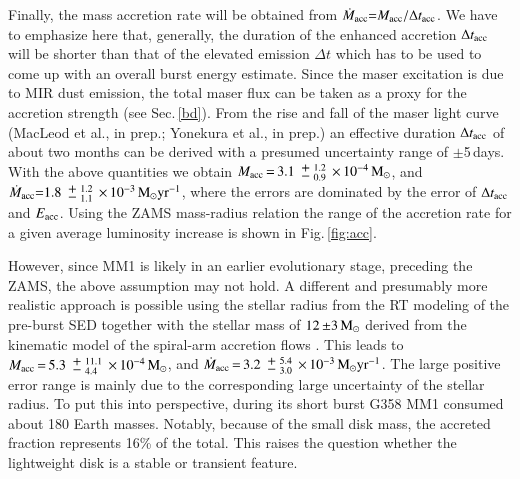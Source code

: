 Finally, the mass accretion rate will be obtained from $\dot{M}_{\rm acc}{=}M_{\rm acc}/\Delta t_{\rm acc}$. We have to emphasize here that, generally, the duration of the enhanced accretion $\Delta t_{\rm acc}$ will be shorter than that of the elevated emission $\Delta t$ which has to be used to come up with an overall burst energy estimate. Since the maser excitation is due to MIR dust emission, the total maser flux can be taken as a proxy for the accretion strength  (see Sec.\,\ref{bd}). From the rise and fall of the maser light curve (MacLeod et al., in prep.; Yonekura et al., in prep.) an effective duration $\Delta t_{\rm acc}$ of about two months can be derived with a presumed uncertainty range of ${\pm}$5\,days.
With the above quantities we obtain %
$M_{\rm acc}\,{=}\,3.1\mypm^{1.2}_{0.9}\,{\times}\,10^{-4}\,{\rm M}_{\odot}$, and $\dot{M}_{\rm acc}{=}1.8\mypm^{1.2}_{1.1}\,{\times}\,10^{-3}\,{\rm M}_{\odot}\rm yr^{-1}$,
where the errors are dominated by the error of 
$\Delta t_{\rm acc}$ and
$E_{\rm acc}$. 
Using the ZAMS mass-radius relation the range of the accretion rate for a given average luminosity increase is shown in Fig.\,\ref{fig:acc}.


However, since MM1 is likely in an earlier evolutionary stage, preceding the ZAMS, the above assumption may not hold. A different and presumably more realistic approach is possible using the
stellar radius from the RT modeling of the pre-burst SED together with the stellar mass of $12\,{\pm}3\,{\rm M}_\odot$ derived from the kinematic model of the spiral-arm accretion flows \citep{2020NatAs.tmp..144C}. This leads to
$M_{\rm acc}\,{=}\,5.3\mypm_{4.4}^{11.1}\,{\times}\,10^{-4}\,{\rm M}_{\odot}$, and $\dot{M}_{\rm acc}\,{=}\,3.2\mypm^{5.4}_{3.0}\,{\times}\,10^{-3}\,{\rm M}_{\odot}\rm yr^{-1}$. The large positive error range is mainly due to the corresponding large uncertainty of the stellar radius.
To put this into perspective, during its
short 
burst G358 MM1 consumed about 180 Earth masses. Notably, because of the small disk mass, the accreted fraction represents 16\% of the total. This raises the question whether the lightweight disk is a stable or transient feature.

